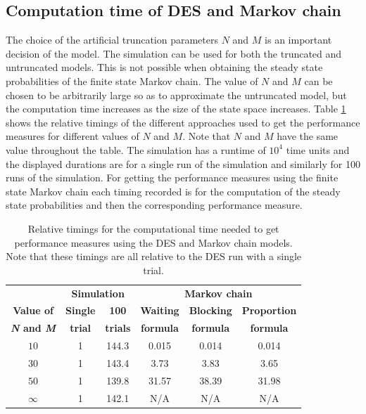 \subsection{Computation time of DES and Markov chain}
\label{sec:computation_time_des_markov_chain}

The choice of the artificial truncation parameters \(N\) and \(M\) is an
important decision of the model.
The simulation can be used for both the truncated and untruncated models.
This is not possible when obtaining the steady state probabilities of the
finite state Markov chain.
The value of \(N\) and \(M\) can be chosen to be arbitrarily large so as to
approximate the untruncated model, but the
computation time increases as the size of the state space increases.
Table \ref{tab:truncation_effect_timings_old} shows the relative timings of the
different approaches used to get the performance measures for different values
of \(N\) and \(M\).
Note that \(N\) and \(M\) have the same value throughout the table.
The simulation has a runtime of \(10^4\) time units and the displayed
durations are for a single run of the simulation and similarly for 100 runs of
the simulation.
For getting the performance measures using the finite state Markov chain each
timing recorded is for the computation of the steady state probabilities and
then the corresponding performance measure.

\tiny
\begin{table}[H]
    \centering
    \caption{Relative timings for the computational time needed to get
    performance measures using the DES and Markov chain models. Note that these
    timings are all relative to the DES run with a single trial.}
    \begin{tabular}{c|cc|ccc}
        & \multicolumn{2}{c}{\textbf{Simulation}} &
        \multicolumn{3}{c}{\textbf{Markov chain}} \\
        \textbf{Value of} & \textbf{Single} & \textbf{100} &
        \textbf{Waiting} & \textbf{Blocking} &
        \textbf{Proportion} \\
        \textbf{\textit{N} and \textit{M}} & \textbf{trial} & \textbf{trials} &
        \textbf{formula} & \textbf{formula} & \textbf{formula} \\
        \hline
        \(10\) & 1 & 144.3 & 0.015  & 0.014  & 0.014 \\
        \hline
        \(30\) & 1 & 143.4 & 3.73   & 3.83   & 3.65 \\
        \hline
        \(50\) & 1 & 139.8 & 31.57  & 38.39  & 31.98 \\
        \hline
        \(\infty\) & 1 & 142.1 & N/A & N/A & N/A \\
    \end{tabular}
    \label{tab:truncation_effect_timings_old}
\end{table}
\normalsize

